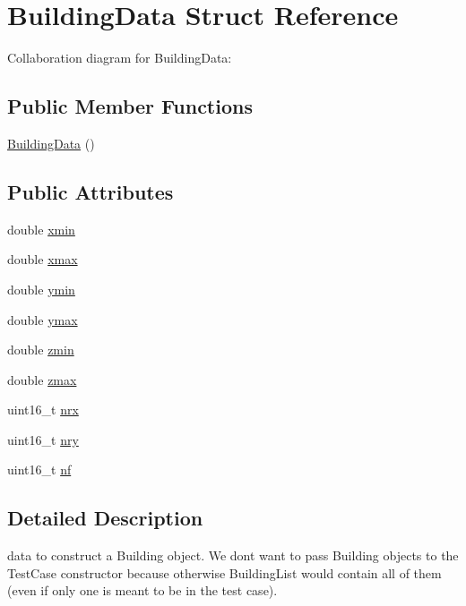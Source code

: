 \hypertarget{structBuildingData}{}\section{Building\+Data Struct Reference}
\label{structBuildingData}


Collaboration diagram for Building\+Data\+:
\subsection*{Public Member Functions}
\begin{DoxyCompactItemize}
\item 
\hyperlink{structBuildingData_a71678fed08e670ee9305f611a9b63d34}{Building\+Data} ()
\end{DoxyCompactItemize}
\subsection*{Public Attributes}
\begin{DoxyCompactItemize}
\item 
double \hyperlink{structBuildingData_a2041c5468f8b7179754b8b88c42183f7}{xmin}
\item 
double \hyperlink{structBuildingData_afa169d4c63bffda0cf1565ea8d850d37}{xmax}
\item 
double \hyperlink{structBuildingData_a2765c6199faa31f0ffbc0f0744dba93b}{ymin}
\item 
double \hyperlink{structBuildingData_af7f9754fe81232f86c7eec4271c0aa64}{ymax}
\item 
double \hyperlink{structBuildingData_aa20a7f4c0ef0e729d5f1072a0d88d8ae}{zmin}
\item 
double \hyperlink{structBuildingData_ad60a7b083575d15baa6e6828cd390763}{zmax}
\item 
uint16\+\_\+t \hyperlink{structBuildingData_aa6ae9d1eb38660fe0e861792b254171b}{nrx}
\item 
uint16\+\_\+t \hyperlink{structBuildingData_abeb8975115b68397f6600af8573e3e74}{nry}
\item 
uint16\+\_\+t \hyperlink{structBuildingData_add6cd0007b1f0224a79c5a45e95f1551}{nf}
\end{DoxyCompactItemize}


\subsection{Detailed Description}
data to construct a Building object. We don\textquotesingle{}t want to pass Building objects to the Test\+Case constructor because otherwise Building\+List would contain all of them (even if only one is meant to be in the test case). 

